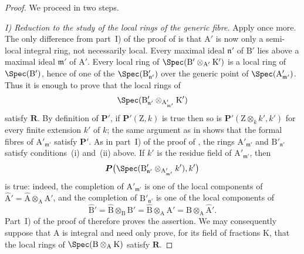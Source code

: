 \begin{proof}
We proceed in two steps.

\emph{I) Reduction to the study of the local rings of the generic fibre.} Apply  once more. The only difference from part~I) of the proof of  is that $\mathrm{A}'$ is now only a semi-local integral ring, not necessarily local. Every maximal ideal $\mathfrak{n}'$ of $\mathrm{B}'$ lies above a maximal ideal $\mathfrak{m}'$ of $\mathrm{A}'$. Every local ring of $\Spec(\mathrm{B}'\otimes_{\mathrm{A}'}\mathrm{K}')$ is a local ring of $\Spec(\mathrm{B}')$, hence of one of the $\Spec(\mathrm{B}'_{\mathfrak{n}'})$ over the generic point of $\Spec(\mathrm{A}'_{\mathfrak{m}'})$. Thus it is enough to prove that the local rings of
\[
  \Spec(\mathrm{B}'_{\mathfrak{n}'}\otimes_{\mathrm{A}'_{\mathfrak{m}'}}\mathrm{K}')
\]
satisfy $\boldsymbol{R}$. By definition of $\boldsymbol{P}'$, if $\boldsymbol{P}'(\mathrm{Z},k)$ is true then so is $\boldsymbol{P}'(\mathrm{Z}\otimes_k k',k')$ for every finite extension $k'$ of $k$; the same argument as in  shows that the formal fibres of $\mathrm{A}'_{\mathfrak{m}'}$ satisfy $\boldsymbol{P}'$. As in part~I) of the proof of , the rings $\mathrm{A}'_{\mathfrak{m}'}$ and $\mathrm{B}'_{\mathfrak{n}'}$ satisfy conditions~(i) and~(ii) above. If $k'$ is the residue field of $\mathrm{A}'_{\mathfrak{m}'}$, then
\[
  \boldsymbol{P}\bigl(\Spec(\mathrm{B}'_{\mathfrak{n}'}\otimes_{\mathrm{A}'_{\mathfrak{m}'}}k'),k'\bigr)
\]
is true: indeed, the completion of $\mathrm{A}'_{\mathfrak{m}'}$ is one of the local components of $\widehat{\mathrm{A}}'=\widehat{\mathrm{A}}\otimes_\mathrm{A}\mathrm{A}'$, and the completion of $\mathrm{B}'_{\mathfrak{n}'}$ is one of the local components of
\[
  \widehat{\mathrm{B}}'=\widehat{\mathrm{B}}\otimes_\mathrm{B}\mathrm{B}'
  =\widehat{\mathrm{B}}\otimes_\mathrm{A}\mathrm{A}'
  =\mathrm{B}\otimes_\mathrm{A}\widehat{\mathrm{A}}'.
\]
Part~I) of the proof of  therefore proves the assertion. We may consequently suppose that $\mathrm{A}$ is integral and need only prove, for its field of fractions $\mathrm{K}$, that the local rings of $\Spec(\mathrm{B}\otimes_\mathrm{A}\mathrm{K})$ satisfy $\boldsymbol{R}$.


\end{proof}

